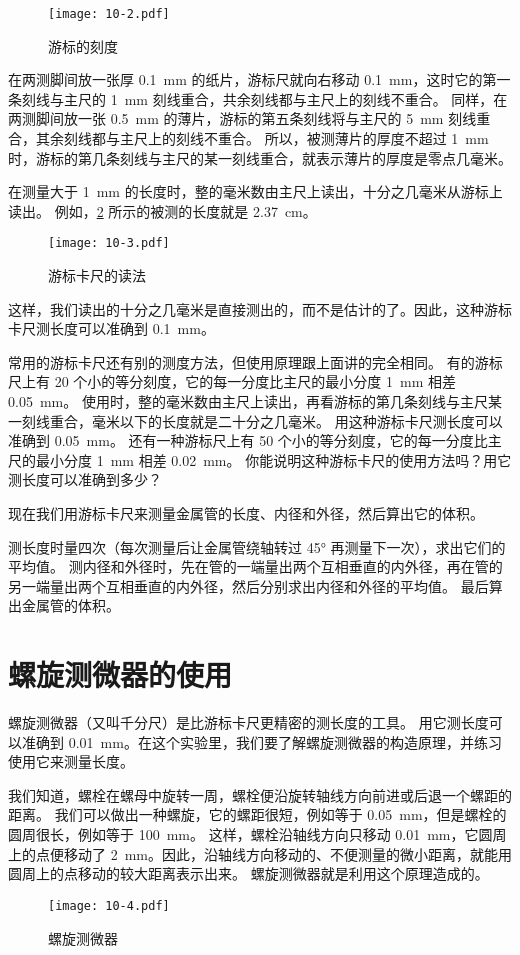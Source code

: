 \begin{figure}
  \texttt{[image: 10-2.pdf]}
  \caption{游标的刻度}\label{fig:10-2}
\end{figure}

在两测脚间放一张厚 \qty{0.1}{mm} 的纸片，游标尺就向右移动 \qty{0.1}{mm}，这时它的第一条刻线与主尺的 \qty{1}{mm} 刻线重合，共余刻线都与主尺上的刻线不重合。
同样，在两测脚间放一张 \qty{0.5}{mm} 的薄片，游标的第五条刻线将与主尺的 \qty{5}{mm} 刻线重合，其余刻线都与主尺上的刻线不重合。
所以，被测薄片的厚度不超过 \qty{1}{mm} 时，游标的第几条刻线与主尺的某一刻线重合，就表示薄片的厚度是零点几毫米。

在测量大于 \qty{1}{mm} 的长度时，整的毫米数由主尺上读出，十分之几毫米从游标上读出。
例如，\cref{fig:10-3} 所示的被测的长度就是 \qty{2.37}{cm}。	
	
\begin{figure}
  \texttt{[image: 10-3.pdf]}
  \caption{游标卡尺的读法}\label{fig:10-3}
\end{figure}

这样，我们读出的十分之几毫米是直接测出的，而不是估计的了。因此，这种游标卡尺测长度可以准确到 \qty{0.1}{mm}。
	
常用的游标卡尺还有别的测度方法，但使用原理跟上面讲的完全相同。
有的游标尺上有 20 个小的等分刻度，它的每一分度比主尺的最小分度 \qty{1}{mm} 相差 \qty{0.05}{mm}。
使用时，整的毫米数由主尺上读出，再看游标的第几条刻线与主尺某一刻线重合，毫米以下的长度就是二十分之几毫米。
用这种游标卡尺测长度可以准确到 \qty{0.05}{mm}。
还有一种游标尺上有 50 个小的等分刻度，它的每一分度比主尺的最小分度 \qty{1}{mm} 相差 \qty{0.02}{mm}。
你能说明这种游标卡尺的使用方法吗？用它测长度可以准确到多少？

现在我们用游标卡尺来测量金属管的长度、内径和外径，然后算出它的体积。

测长度时量四次（每次测量后让金属管绕轴转过 \ang{45} 再测量下一次），求出它们的平均值。
测内径和外径时，先在管的一端量出两个互相垂直的内外径，再在管的另一端量出两个互相垂直的内外径，然后分别求出内径和外径的平均值。
最后算出金属管的体积。

\section{螺旋测微器的使用}
螺旋测微器（又叫千分尺）是比游标卡尺更精密的测长度的工具。
用它测长度可以准确到 \qty{0.01}{mm}。在这个实验里，我们要了解螺旋测微器的构造原理，并练习使用它来测量长度。

我们知道，螺栓在螺母中旋转一周，螺栓便沿旋转轴线方向前进或后退一个螺距的距离。
我们可以做出一种螺旋，它的螺距很短，例如等于 \qty{0.05}{mm}，但是螺栓的圆周很长，例如等于 \qty{100}{mm}。
这样，螺栓沿轴线方向只移动 \qty{0.01}{mm}，它圆周上的点便移动了 \qty{2}{mm}。因此，沿轴线方向移动的、不便测量的微小距离，就能用圆周上的点移动的较大距离表示出来。
螺旋测微器就是利用这个原理造成的。
\begin{figure}
  \texttt{[image: 10-4.pdf]}
  \caption{螺旋测微器}\label{fig:10-4}
\end{figure}

